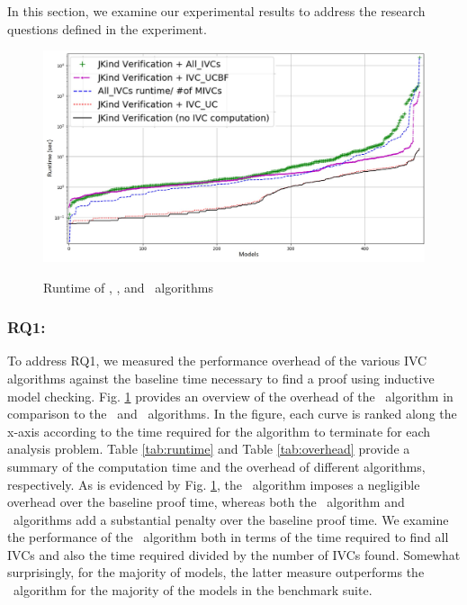 In this section, we examine our experimental results to address the research questions defined in the experiment.

\begin{figure}[t]
 \centering
  \includegraphics[width=\textwidth]{figs/performance.jpg}
  \label{fig:performance}
  \vspace{-0.2in}
  \caption{Runtime of \aivcalg, \ucbfalg, and \ucalg ~algorithms}
\end{figure}

\subsubsection{RQ1:} 

To address RQ1, we measured the performance overhead of the various IVC algorithms against the baseline time
necessary to find a proof using inductive model checking. Fig. \ref{fig:performance} provides an overview of the  overhead of the \aivcalg ~algorithm in comparison to the \ucalg ~and \ucbfalg\ algorithms.  In the figure, each curve is ranked along the x-axis according to the time required for the algorithm to terminate for each analysis problem.  Table \ref{tab:runtime} and Table \ref{tab:overhead} provide a summary of the computation time and the overhead of different algorithms, respectively.  As is evidenced by Fig. \ref{fig:performance}, the \ucalg\  algorithm imposes a negligible overhead over the baseline proof time, whereas both the \ucbfalg\ algorithm and \aivcalg\ algorithms add a substantial penalty over the baseline proof time.  We examine the performance of the \aivcalg\ algorithm both in terms of the time required to find all IVCs and also the time required divided by the number of IVCs found.  Somewhat surprisingly, for the majority of models, the latter measure outperforms the \ucbfalg\ algorithm for the majority of the models in the benchmark suite.

